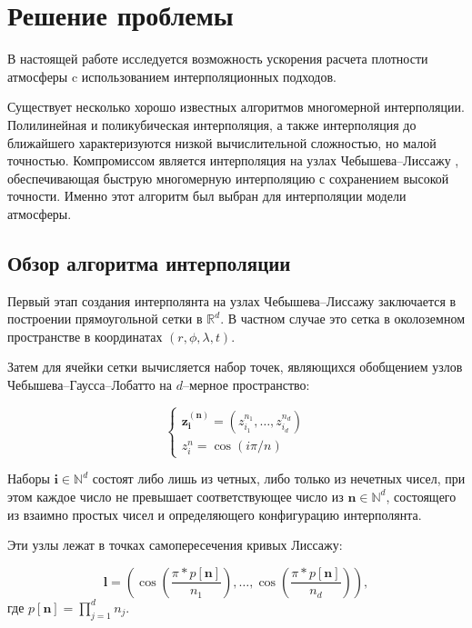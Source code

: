 \section{Решение проблемы}
\label{sec:Chapter2} 

В настоящей работе исследуется возможность ускорения расчета плотности атмосферы c
использованием интерполяционных подходов.

Существует несколько хорошо известных алгоритмов многомерной интерполяции. Полилинейная и
поликубическая интерполяция, а также интерполяция до ближайшего характеризуются низкой
вычислительной сложностью, но малой точностью. 
Компромиссом является интерполяция на узлах Чебышева--Лиссажу \cite{dencker2017}, обеспечивающая
быструю многомерную интерполяцию с сохранением высокой точности. 
Именно этот алгоритм был выбран для интерполяции модели атмосферы.

\subsection{Обзор алгоритма интерполяции}
Первый этап создания интерполянта на узлах Чебышева--Лиссажу заключается в построении 
прямоугольной сетки в $\mathbb{R}^d$. В частном случае это сетка в
околоземном пространстве в координатах $(r, \phi, \lambda, t)$.

Затем для ячейки сетки вычисляется набор точек, являющихся обобщением
узлов Чебышева--Гаусса--Лобатто на $d$--мерное пространство:

\begin{equation*}
    \begin{cases*}
        \mathbf{z_{\mathbf{i}}^{\mathbf{(\mathbf{n})}}} = (z_{i_1}^{n_1}, \dots, z_{i_d}^{n_d}) \\
        z_i^{n} = \cos (i \pi / n)
    \end{cases*}
\end{equation*}

Наборы $\mathbf{i} \in \mathbb{N}^d$ состоят либо лишь из четных, либо только из нечетных чисел, при этом каждое
число не превышает соответствующее число из $\mathbf{n} \in \mathbb{N}^d$, 
состоящего из взаимно простых чисел и определяющего конфигурацию интерполянта.

Эти узлы лежат в точках самопересечения кривых Лиссажу:

\begin{equation*}
    \mathbf{l} = \left(\cos \left( \frac{\pi * p[\mathbf{n}]}{n_1} \right), 
                \dots,\cos \left( \frac{\pi * p[\mathbf{n}]}{n_d} \right) \right),
\end{equation*}
где $p[\mathbf{n}] = \prod_{j=1}^{d} n_j$.

